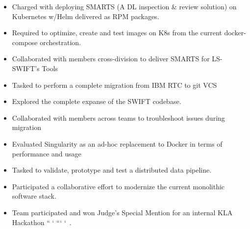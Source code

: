 \documentclass[10pt,a4paper,ragged2e,withhyper]{altacv}
\begin{document}
\begin{paracol}{2}


\begin{itemize}
    \item Charged with deploying SMARTS (A DL inspection \& review solution) on Kubernetes w/Helm delivered as RPM packages.
    \item Required to optimize, create and test images on K8s from the current docker-compose orchestration.
    \item Collaborated with members cross-division to deliver SMARTS for LS-SWIFT's Tools
\end{itemize}


\divider

\begin{itemize}
    \item Tasked to perform a complete migration from IBM RTC to git VCS
    \item Explored the complete expanse of the SWIFT codebase.
    \item Collaborated with members across teams to troubleshoot issues during migration
\end{itemize}

\divider

\begin{itemize}
    \item Evaluated Singularity as an ad-hoc replacement to Docker in terms of performance and usage
\end{itemize}

\divider

\begin{itemize}
    \item Tasked to validate, prototype and test a distributed data pipeline.
    \item Participated a collaborative effort to modernize the current monolithic software stack.
    \item Team participated and won Judge's Special Mention for an internal KLA Hackathon       ``  `   ```                         `~.
\end{itemize}


\end{paracol}
\end{document}
